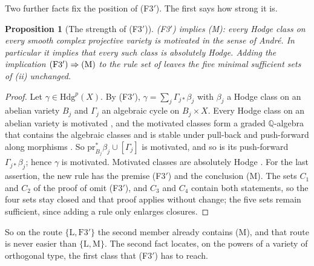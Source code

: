 \documentclass[11pt,reqno]{amsart}
\theoremstyle{plain}
\newtheorem{proposition}[theorem]{Proposition}
\theoremstyle{definition}
\theoremstyle{remark}
\newcommand{\QQ}{\mathbb{Q}}
\newcommand{\Hdg}{\mathrm{Hdg}}
\begin{document}
Two further facts fix the position of \textup{(F3$'$)}. The first says how
strong it is.

\begin{proposition}[The strength of \textup{(F3$'$)}]\label{prop:f3primestrength}
\textup{(F3$'$)} implies \textup{(M)}: every Hodge class on every smooth
complex projective variety is motivated in the sense of Andr\'e. In
particular it implies that every such class is absolutely Hodge. Adding the
implication $\textup{(F3$'$)}\Rightarrow\textup{(M)}$ to the rule set of
 leaves the five minimal sufficient sets of
(ii) unchanged.
\end{proposition}

\begin{proof}
Let $\gamma\in\Hdg^{p}(X)$. By \textup{(F3$'$)},
$\gamma=\sum_{j}\Gamma_{j*}\beta_{j}$ with $\beta_{j}$ a Hodge class on an
abelian variety $B_{j}$ and $\Gamma_{j}$ an algebraic cycle on $B_{j}\times X$.
Every Hodge class on an abelian variety is motivated
\cite[Th\'eor\`eme~0.6.2]{And96b}, and the motivated classes form a graded
$\QQ$-algebra that contains the algebraic classes and is stable under
pull-back and push-forward along morphisms \cite[\S2]{And96b}. So
$\mathrm{pr}_{B_{j}}^{*}\beta_{j}\cup[\Gamma_{j}]$ is motivated, and so is its
push-forward $\Gamma_{j*}\beta_{j}$; hence $\gamma$ is motivated. Motivated
classes are absolutely Hodge \cite[\S2]{And96b}. For the last assertion,
the new rule has the premise (F3$'$) and the conclusion (M). The sets $C_{1}$
and $C_{2}$ of the proof of  omit (F3$'$), and $C_{3}$ and
$C_{4}$ contain both statements, so the four sets stay closed and that proof
applies without change; the five sets remain sufficient, since adding a rule
only enlarges closures.
\end{proof}

So on the route $\{\mathrm{L},\mathrm{F3}'\}$ the second member already
contains \textup{(M)}, and that route is never easier than
$\{\mathrm{L},\mathrm{M}\}$. The second fact locates, on the powers of a variety of orthogonal type,
the first class that \textup{(F3$'$)} has to reach.
\end{document}
